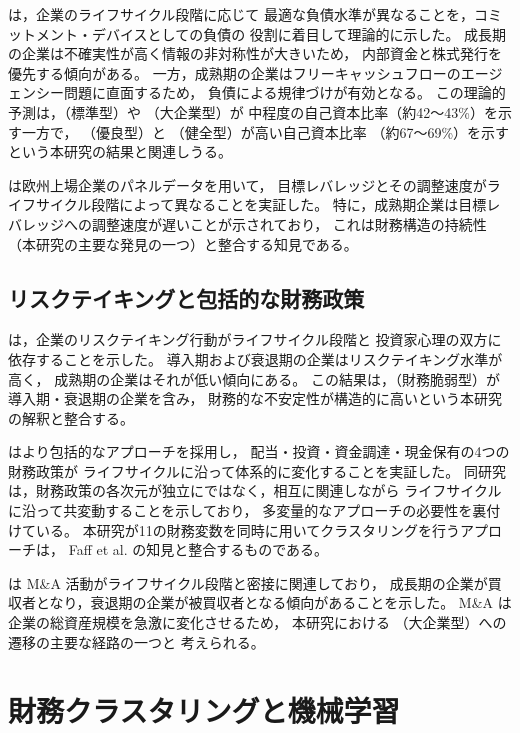  は，企業のライフサイクル段階に応じて
最適な負債水準が異なることを，コミットメント・デバイスとしての負債の
役割に着目して理論的に示した。
成長期の企業は不確実性が高く情報の非対称性が大きいため，
内部資金と株式発行を優先する傾向がある。
一方，成熟期の企業はフリーキャッシュフローのエージェンシー問題に直面するため，
負債による規律づけが有効となる。
この理論的予測は，（標準型）や （大企業型）が
中程度の自己資本比率（約42〜43\%）を示す一方で，
（優良型）と （健全型）が高い自己資本比率
（約67〜69\%）を示すという本研究の結果と関連しうる。

 は欧州上場企業のパネルデータを用いて，
目標レバレッジとその調整速度がライフサイクル段階によって異なることを実証した。
特に，成熟期企業は目標レバレッジへの調整速度が遅いことが示されており，
これは財務構造の持続性（本研究の主要な発見の一つ）と整合する知見である。

\subsection{リスクテイキングと包括的な財務政策}

 は，企業のリスクテイキング行動がライフサイクル段階と
投資家心理の双方に依存することを示した。
導入期および衰退期の企業はリスクテイキング水準が高く，
成熟期の企業はそれが低い傾向にある。
この結果は，（財務脆弱型）が導入期・衰退期の企業を含み，
財務的な不安定性が構造的に高いという本研究の解釈と整合する。

 はより包括的なアプローチを採用し，
配当・投資・資金調達・現金保有の4つの財務政策が
ライフサイクルに沿って体系的に変化することを実証した。
同研究は，財務政策の各次元が独立にではなく，相互に関連しながら
ライフサイクルに沿って共変動することを示しており，
多変量的なアプローチの必要性を裏付けている。
本研究が11の財務変数を同時に用いてクラスタリングを行うアプローチは，
Faff et al. の知見と整合するものである。

 は M\&A 活動がライフサイクル段階と密接に関連しており，
成長期の企業が買収者となり，衰退期の企業が被買収者となる傾向があることを示した。
M\&A は企業の総資産規模を急激に変化させるため，
本研究における （大企業型）への遷移の主要な経路の一つと
考えられる。

\section{財務クラスタリングと機械学習}
\label{sec:lit-clustering}

